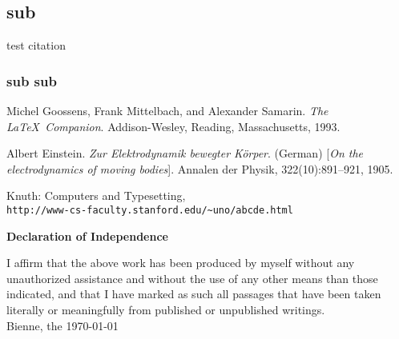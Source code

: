 \documentclass[12pt,a4paper]{article}
\begin{document}
\subsection{sub}
test citation \cite{einstein}
\subsubsection{sub sub}

\markboth{}{}

\newpage
\begin{thebibliography}{9}
Michel Goossens, Frank Mittelbach, and Alexander Samarin.
\textit{The \LaTeX\ Companion}.
Addison-Wesley, Reading, Massachusetts, 1993.

Albert Einstein.
\textit{Zur Elektrodynamik bewegter K{\"o}rper}. (German)
[\textit{On the electrodynamics of moving bodies}].
Annalen der Physik, 322(10):891–921, 1905.

Knuth: Computers and Typesetting,
\\\texttt{http://www-cs-faculty.stanford.edu/\~{}uno/abcde.html}
\end{thebibliography}



\newpage
\thispagestyle{empty}
\markboth{}{}
  \normalsize
\begin{center}
\huge{\bf Declaration of Independence}\\[40mm]
\end{center}
\large
I affirm that the above work has been produced by myself without any unauthorized assistance and without the use of any other means than those indicated, and that I have marked as such all passages that have been taken literally or meaningfully from published or unpublished writings.\\[50mm]
Bienne, the \today

\newpage
\end{document}
